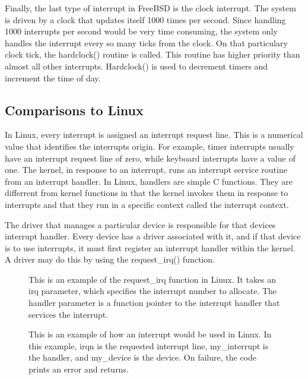 \documentclass[journal,letterpaper,draftclsnofoot,onecolumn,10pt]{IEEEtran}
\begin{document}
Finally, the last type of interrupt in FreeBSD is the clock interrupt. The system is driven by a clock that updates itself 1000 times per second. Since handling 1000 interrupts per second would be very time consuming, the system only handles the interrupt every so many ticks from the clock. On that particulary clock tick, the hardclock() routine is called. This routine has higher priority than almost all other interrupts. Hardclock() is used to decrement timers and increment the time of day.\cite{mn15}

\subsection{Comparisons to Linux}

In Linux, every interrupt is assigned an interrupt request line. This is a numerical value that identifies the interrupts origin. For example, timer interrupts usually have an interrupt request line of zero, while keyboard interrupts have a value of one. The kernel, in response to an interrupt, runs an interrupt service routine from an interrupt handler. In Linux, handlers are simple C functions. They are differrent from kernel functions in that the kernel invokes them in response to interrupts and that they run in a specific context called the interrupt context.\cite{l05}
 
The driver that manages a particular device is responsible for that devices interrupt handler. Every device has a driver associated with it, and if that device is to use interrupts, it must first register an interrupt handler within the kernel. A driver may do this by using the request\_irq() function.\cite{l05}

\begin{figure}[H]
   
   \caption{This is an example of the request\_irq function in Linux. It takes an irq parameter, which specifies the interrupt number to allocate. The handler parameter is a function pointer to the interrupt handler that services the interrupt.}
\end{figure}
 
\begin{figure}[H]
   
   \caption{This is an example of how an interrupt would be used in Linux. In this example, irqn is the requested interrupt line, my\_interrupt is the handler, and my\_device is the device. On failure, the code prints an error and returns.}
\end{figure}
\end{document}
